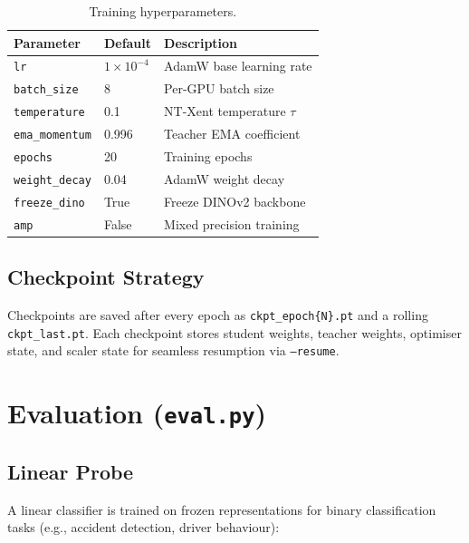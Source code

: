 \documentclass[12pt,a4paper]{article}
\begin{document}
\begin{table}[H]
\centering
\renewcommand{\arraystretch}{1.3}
\begin{tabular}{lll}
\toprule
\textbf{Parameter} & \textbf{Default} & \textbf{Description} \\
\midrule
\texttt{lr}             & $1 \times 10^{-4}$  & AdamW base learning rate \\
\texttt{batch\_size}    & 8                    & Per-GPU batch size \\
\texttt{temperature}    & 0.1                  & NT-Xent temperature $\tau$ \\
\texttt{ema\_momentum}  & 0.996                & Teacher EMA coefficient \\
\texttt{epochs}         & 20                   & Training epochs \\
\texttt{weight\_decay}  & 0.04                 & AdamW weight decay \\
\texttt{freeze\_dino}   & True                 & Freeze DINOv2 backbone \\
\texttt{amp}            & False                & Mixed precision training \\
\bottomrule
\end{tabular}
\caption{Training hyperparameters.}
\end{table}

\subsection{Checkpoint Strategy}

Checkpoints are saved after every epoch as \texttt{ckpt\_epoch\{N\}.pt} and a rolling
\texttt{ckpt\_last.pt}. Each checkpoint stores student weights, teacher weights,
optimiser state, and scaler state for seamless resumption via \texttt{--resume}.

\section{Evaluation (\texttt{eval.py})}

\subsection{Linear Probe}

A linear classifier is trained on frozen representations for binary classification tasks
(e.g., accident detection, driver behaviour):
\end{document}
